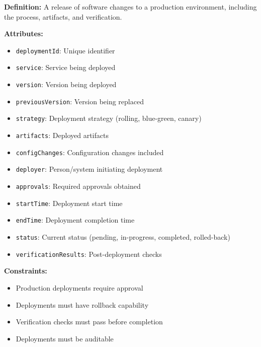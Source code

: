 \documentclass[11pt,letterpaper]{article}
\begin{document}
\begin{definitionbox}
\textbf{Definition:} A release of software changes to a production environment, including the process, artifacts, and verification.

\textbf{Attributes:}
\begin{itemize}[nosep]
    \item \texttt{deploymentId}: Unique identifier
    \item \texttt{service}: Service being deployed
    \item \texttt{version}: Version being deployed
    \item \texttt{previousVersion}: Version being replaced
    \item \texttt{strategy}: Deployment strategy (rolling, blue-green, canary)
    \item \texttt{artifacts}: Deployed artifacts
    \item \texttt{configChanges}: Configuration changes included
    \item \texttt{deployer}: Person/system initiating deployment
    \item \texttt{approvals}: Required approvals obtained
    \item \texttt{startTime}: Deployment start time
    \item \texttt{endTime}: Deployment completion time
    \item \texttt{status}: Current status (pending, in-progress, completed, rolled-back)
    \item \texttt{verificationResults}: Post-deployment checks
\end{itemize}

\textbf{Constraints:}
\begin{itemize}[nosep]
    \item Production deployments require approval
    \item Deployments must have rollback capability
    \item Verification checks must pass before completion
    \item Deployments must be auditable
\end{itemize}
\end{definitionbox}
\end{document}

